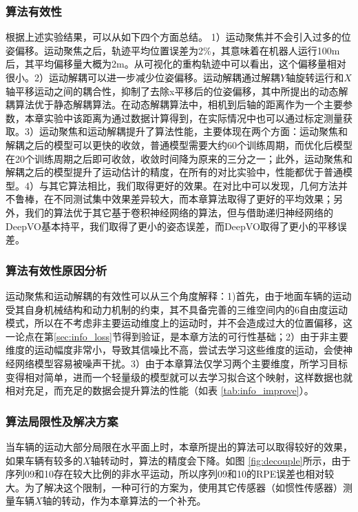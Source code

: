 \subsubsection{算法有效性}
根据上述实验结果，可以从如下四个方面总结。
1）运动聚焦并不会引入过多的位姿偏移。运动聚焦之后，轨迹平均位置误差为2\%，其意味着在机器人运行100m后，其平均偏移量大概为2m。从可视化的重构轨迹中可以看出，这个偏移量相对很小。2）运动解耦可以进一步减少位姿偏移。运动解耦通过解耦$Y$轴旋转运行和$X$轴平移运动之间的耦合性，抑制了去除x平移后的位姿偏移，其中所提出的动态解耦算法优于静态解耦算法。在动态解耦算法中，相机到后轴的距离作为一个主要参数，本章实验中该距离为通过数据计算得到，在实际情况中也可以通过标定测量获取。3）运动聚焦和运动解耦提升了算法性能，主要体现在两个方面：运动聚焦和解耦之后的模型可以更快的收敛，普通模型需要大约60个训练周期，而优化后模型在20个训练周期之后即可收敛，收敛时间降为原来的三分之一；此外，运动聚焦和解耦之后的模型提升了运动估计的精度，在所有的对比实验中，性能都优于普通模型。4）与其它算法相比，我们取得更好的效果。在对比中可以发现，几何方法并不鲁棒，在不同测试集中效果差异较大，而本章算法取得了更好的平均效果；另外，我们的算法优于其它基于卷积神经网络的算法，但与借助递归神经网络的DeepVO基本持平，我们取得了更小的姿态误差，而DeepVO取得了更小的平移误差。

\subsubsection{算法有效性原因分析}
运动聚焦和运动解耦的有效性可以从三个角度解释：1)首先，由于地面车辆的运动受其自身机械结构和动力机制的约束，其不具备完善的三维空间内的6自由度运动模式，所以在不考虑非主要运动维度上的运动时，并不会造成过大的位置偏移，这一论点在第\ref{sec:info_loss}节得到验证，是本章方法的可行性基础；2）由于非主要维度的运动幅度非常小，导致其信噪比不高，尝试去学习这些维度的运动，会使神经网络模型容易被噪声干扰。3）由于本章算法仅学习两个主要维度，所学习目标变得相对简单，进而一个轻量级的模型就可以去学习拟合这个映射，这样数据也就相对充足，而充足的数据会提升算法的性能（如表 \ref{tab:info_improve}）。

\subsubsection{算法局限性及解决方案}
当车辆的运动大部分局限在水平面上时，本章所提出的算法可以取得较好的效果，如果车辆有较多的$X$轴转动时，算法的精度会下降。如图 \ref{fig:decouple}所示，由于序列09和10存在较大比例的非水平运动，所以序列09和10的RPE误差也相对较大。为了解决这个限制，一种可行的方案为，使用其它传感器（如惯性传感器）测量车辆$X$轴的转动，作为本章算法的一个补充。

